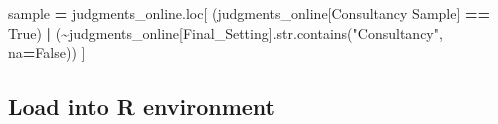 \documentclass[
]{article}
\newenvironment{Shaded}{\begin{snugshade}}{\end{snugshade}}
\newcommand{\BuiltInTok}[1]{#1}
\newcommand{\NormalTok}[1]{#1}
\newcommand{\OperatorTok}[1]{\textcolor[rgb]{0.81,0.36,0.00}{\textbf{#1}}}
\newcommand{\StringTok}[1]{\textcolor[rgb]{0.31,0.60,0.02}{#1}}
\newcommand{\VariableTok}[1]{\textcolor[rgb]{0.00,0.00,0.00}{#1}}
\begin{document}
\begin{Shaded}
\begin{Highlighting}[]

\NormalTok{sample }\OperatorTok{=}\NormalTok{ judgments\_online.loc[}
\NormalTok{    (judgments\_online[}\StringTok{\textquotesingle{}Consultancy Sample\textquotesingle{}}\NormalTok{] }\OperatorTok{==} \VariableTok{True}\NormalTok{) }\OperatorTok{|}
\NormalTok{    (}\OperatorTok{\textasciitilde{}}\NormalTok{judgments\_online[}\StringTok{\textquotesingle{}Final\_Setting\textquotesingle{}}\NormalTok{].}\BuiltInTok{str}\NormalTok{.contains(}\StringTok{"Consultancy"}\NormalTok{, na}\OperatorTok{=}\VariableTok{False}\NormalTok{))}
\NormalTok{]}
\end{Highlighting}
\end{Shaded}

\subsection{Load into R environment}\label{load-into-r-environment}
\end{document}
